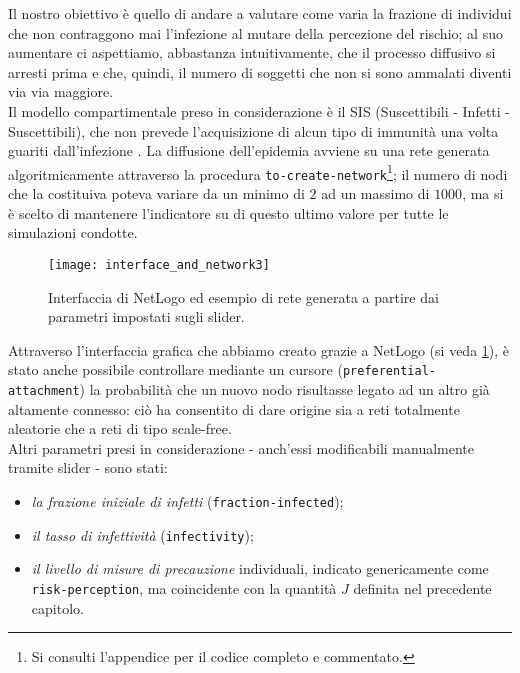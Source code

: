 Il nostro obiettivo è quello di andare a valutare come varia la frazione di individui che non contraggono mai l'infezione al mutare della percezione del rischio; al suo aumentare ci aspettiamo, abbastanza intuitivamente, che il processo diffusivo si arresti prima e che, quindi, il numero di soggetti che non si sono ammalati diventi via via maggiore. \\Il modello compartimentale preso in considerazione è il SIS (Suscettibili - Infetti - Suscettibili), che non prevede l'acquisizione di alcun tipo di immunità una volta guariti dall'infezione \cite{Brauer}. 
La diffusione dell'epidemia avviene su una rete generata algoritmicamente attraverso la procedura \texttt{to-create-network}\footnote{Si consulti l'appendice per il codice completo e commentato.}; il numero di nodi che la costituiva poteva variare da un minimo di $ 2 $ ad un massimo di $ 1000 $, ma si è scelto di mantenere l'indicatore su di questo ultimo valore per tutte le simulazioni condotte.
\begin{figure}[h]
		\begin{center}
			\texttt{[image: interface\_and\_network3]}
			\caption{Interfaccia di NetLogo ed esempio di rete generata a partire dai parametri impostati sugli slider.}
			\label{fig:NetLogo1}
		\end{center}
\end{figure}
Attraverso l'interfaccia grafica che abbiamo creato grazie a NetLogo (si veda \cref{fig:NetLogo1}), è stato anche possibile controllare mediante un cursore (\texttt{preferential-attachment}) la probabilità che un nuovo nodo risultasse legato ad un altro già altamente connesso: ciò ha consentito di dare origine sia a reti totalmente aleatorie che a reti di tipo scale-free. \\Altri parametri presi in considerazione - anch'essi modificabili manualmente tramite slider - sono stati:
\begin{itemize}
\item \textit{la frazione iniziale di infetti} (\texttt{fraction-infected});
\item \textit{il tasso di infettività} (\texttt{infectivity});
\item \textit{il livello di misure di precauzione} individuali, indicato genericamente come \texttt{risk-perception}, ma coincidente con la quantità $ J $ definita nel precedente capitolo.
\end{itemize}

